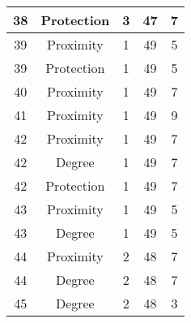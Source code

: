\documentclass[results.tex]{subfiles}
\begin{document}
\begin{center}
\begin{tabular}{| c || c | c | c | c |}
            \hline
            38                      & Protection                   & 3                      & 47                      & 7                    \\
            \hline
            39                      & Proximity                    & 1                      & 49                      & 5                    \\
            \hline
            39                      & Protection                   & 1                      & 49                      & 5                    \\
            \hline
            40                      & Proximity                    & 1                      & 49                      & 7                    \\
            \hline
            41                      & Proximity                    & 1                      & 49                      & 9                    \\
            \hline
            42                      & Proximity                    & 1                      & 49                      & 7                    \\
            \hline
            42                      & Degree                       & 1                      & 49                      & 7                    \\
            \hline
            42                      & Protection                   & 1                      & 49                      & 7                    \\
            \hline
            43                      & Proximity                    & 1                      & 49                      & 5                    \\
            \hline
            43                      & Degree                       & 1                      & 49                      & 5                    \\
            \hline
            44                      & Proximity                    & 2                      & 48                      & 7                    \\
            \hline
            44                      & Degree                       & 2                      & 48                      & 7                    \\
            \hline
            45                      & Degree                       & 2                      & 48                      & 3                    \\

\end{tabular}
\end{center}
\end{document}
